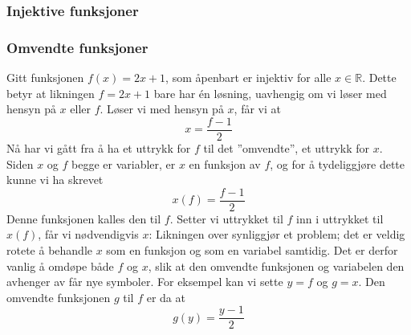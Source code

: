\subsubsection{Injektive funksjoner}
\subsubsection{Omvendte funksjoner}
Gitt funksjonen $ f(x)=2x+1 $, som åpenbart er injektiv for alle $ x\in \mathbb{R} $. Dette betyr at likningen $ f=2x+1 $ bare har én løsning, uavhengig om vi løser med hensyn på $ x $ eller $ f $. Løser vi med hensyn på $ x $, får vi at
\[ x=\frac{f-1}{2} \]
Nå har vi gått fra å ha et uttrykk for $ f $ til det ''omvendte'', et uttrykk for $ x $. Siden $ x $ og $ f $ begge er variabler, er $ x $ en funksjon av $ f $, og for å tydeliggjøre dette kunne vi ha skrevet
\[ x(f)=\frac{f-1}{2} \]
Denne funksjonen kalles den  til $ f $. Setter vi uttrykket til $ f $ inn i uttrykket til $ x(f) $, får vi nødvendigvis $ x $:
Likningen over synliggjør et problem; det er veldig rotete å behandle $ x $ som en funksjon og som en variabel samtidig. Det er derfor vanlig å omdøpe både $ f $ og $ x $, slik at den omvendte funksjonen og variabelen den avhenger av får nye symboler. For eksempel kan vi sette $ y=f$ og $ g=x $. Den omvendte funksjonen $ g $ til $ f $ er da at
\[ g(y)=\frac{y-1}{2} \]
\newpage
{}
